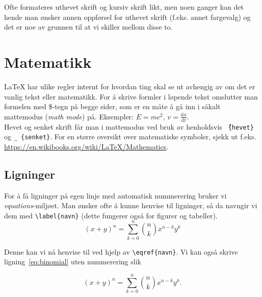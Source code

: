 \documentclass[a4paper,11pt]{article}
\begin{document}
Ofte formateres uthevet skrift og kursiv skrift likt, men noen ganger kan det hende man ønsker annen oppførsel for uthevet skrift (f.eks. annet fargevalg) og det er noe av grunnen til at vi skiller mellom disse to.

\section{Matematikk}
\LaTeX{} har ulike regler internt for hvordan ting skal se ut avhengig av om det er vanlig tekst eller matematikk. For å skrive formler i løpende tekst omslutter man formelen med \$-tegn på begge sider, som er en måte å gå inn i såkalt mattemodus (\emph{math mode}) på. Eksempler: $E = mc^2$, $v = \frac{\mathrm{d}x}{\mathrm{d}t}$.\\
Hevet og senket skrift får man i mattemodus ved bruk av henholdsvis \texttt{\^\,\{hevet\}} og \texttt{\_\,\{senket\}}. For en større oversikt over matematiske symboler, sjekk ut f.eks. \url{https://en.wikibooks.org/wiki/LaTeX/Mathematics}.

\subsection{Ligninger}
For å få ligninger på egen linje med automatisk nummerering bruker vi\\ \emph{equations}-miljøet.
Man ønsker ofte å kunne henvise til ligninger, så da navngir vi dem med \texttt{\textbackslash label\{navn\}} (dette fungerer også for figurer og tabeller).\\

\begin{equation}
(x + y)^n = \sum_{k = 0}^n \binom{n}{k} x^{n-k} y^k
\label{eq:binomial}
\end{equation}

Denne kan vi nå henvise til ved hjelp av \texttt{\textbackslash eqref\{navn\}}. Vi kan også skrive ligning~\eqref{eq:binomial} uten nummerering slik

\begin{equation*}
(x + y)^n = \sum_{k = 0}^n \binom{n}{k} x^{n-k} y^k.
\end{equation*}
\end{document}
